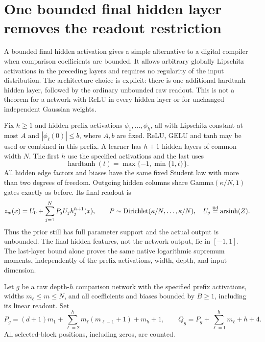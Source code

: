 \section{One bounded final hidden layer removes the readout restriction}
\label{sec:final-bounded-hidden}
A bounded final hidden activation gives a simple alternative to a
digital compiler when comparison coefficients are bounded. It allows
arbitrary globally Lipschitz activations in the preceding layers and
requires no regularity of the input distribution. The architecture
choice is explicit: there is one additional hardtanh hidden layer,
followed by the ordinary unbounded raw readout. This is not a theorem
for a network with ReLU in every hidden layer or for unchanged
independent Gaussian weights.

Fix $h\ge1$ and hidden-prefix activations $\phi_1,\ldots,\phi_h$, all with
Lipschitz constant at most $A$ and $|\phi_\ell(0)|\le b$, where
$A,b$ are fixed. ReLU, GELU and tanh may be used or combined in this
prefix. A learner has $h+1$ hidden layers of common width $N$.
The first $h$ use the specified activations and the last uses
\[
 \operatorname{hardtanh}(t)=\max\{-1,\min\{1,t\}\}.
\]
All hidden edge factors and biases have the same fixed Student law
with more than two degrees of freedom. Outgoing hidden columns share
Gamma$(\kappa/N,1)$ gates exactly as before. Its final readout is
\[
 z_w(x)=U_0+\sum_{j=1}^NP_jU_jh_j^{h+1}(x),\qquad
 P\sim\operatorname{Dirichlet}(\kappa/N,\ldots,\kappa/N),
 \quad U_j\stackrel{\rm iid}=\operatorname{arsinh}(Z).
\]
Thus the prior still has full parameter support and the actual output
is unbounded. The final hidden features, not the network output, lie
in $[-1,1]$. The last-layer bound alone proves the same native
logarithmic supremum moments, independently of the prefix activations,
width, depth, and input dimension.

Let $g$ be a raw depth-$h$ comparison network with the specified prefix
activations, widths $m_\ell\le m\le N$, and all coefficients and
biases bounded by $B\ge1$, including its linear readout. Set
\[
 P_g=(d+1)m_1+\sum_{\ell=2}^h m_\ell(m_{\ell-1}+1)+m_h+1,
 \qquad Q_g=P_g+\sum_{\ell=1}^h m_\ell+h+4.
\]
All selected-block positions, including zeros, are counted.

